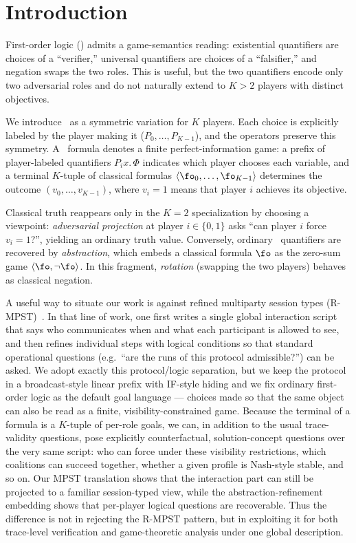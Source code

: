 \section{Introduction}

First-order logic (\FOL) admits a game-semantics reading: existential
quantifiers are choices of a ``verifier,'' universal quantifiers are choices
of a ``falsifier,'' and negation swaps the two roles. This is useful, but the
two quantifiers encode only two adversarial roles and do not naturally
extend to $K>2$ players with distinct objectives.

We introduce \KFOL\ as a symmetric variation for $K$ players.
Each choice is explicitly labeled by the player making it
($P_0, \dots, P_{K-1}$), and the operators preserve this symmetry.
A \KFOL\ formula denotes a finite perfect-information game:
a prefix of player-labeled quantifiers $P_i x.\,\Phi$ indicates
which player chooses each variable, and a terminal $K$-tuple of classical
formulas $\langle \fo_0, \dots, \fo_{K-1} \rangle$
determines the outcome $(v_0, \dots, v_{K-1})$, where $v_i = 1$
means that player $i$ achieves its objective.

Classical truth reappears only in the $K=2$ specialization by choosing
a viewpoint: \emph{adversarial projection} at player $i \in \{0,1\}$ asks
``can player $i$ force $v_i = 1$?'', yielding an ordinary truth value.
Conversely, ordinary \FOL\ quantifiers are recovered by
\emph{abstraction}, which embeds a classical formula $\fo$ as the
zero-sum game $\langle \fo, \neg \fo \rangle$.
In this fragment, \emph{rotation} (swapping the two players) behaves as
classical negation.

A useful way to situate our work is against refined multiparty session types (R-MPST)~\cite{vassor2024refinements}. In that line of work, one first writes a single global interaction script that says who communicates when and what each participant is allowed to see, and then refines individual steps with logical conditions so that standard operational questions (e.g.\ ``are the runs of this protocol admissible?'') can be asked. We adopt exactly this protocol/logic separation, but we keep the protocol in a broadcast-style linear prefix with IF-style hiding and we fix ordinary first-order logic as the default goal language --- choices made so that the same object can also be read as a finite, visibility-constrained game. Because the terminal of a \KFOL{} formula is a $K$-tuple of per-role goals, we can, in addition to the usual trace-validity questions, pose explicitly counterfactual, solution-concept questions over the very same script: who can force under these visibility restrictions, which coalitions can succeed together, whether a given profile is Nash-style stable, and so on. Our MPST translation shows that the interaction part can still be projected to a familiar session-typed view, while the abstraction-refinement embedding shows that per-player logical questions are recoverable. Thus the difference is not in rejecting the R-MPST pattern, but in exploiting it for both trace-level verification and game-theoretic analysis under one global description.

